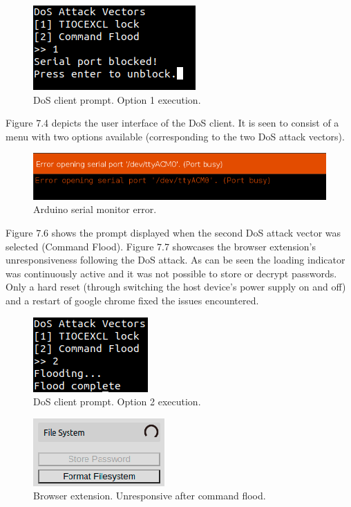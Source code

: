 \begin{figure}[H]
\centering
\includegraphics[width=0.35\columnwidth]{Figures/Fig_32.png}
\caption{DoS client prompt. Option 1 execution.}
\label{fig:gantt}
\end{figure}

Figure 7.4 depicts the user interface of the DoS client. It is seen to consist of a menu with two options available (corresponding to the two DoS attack vectors).
\begin{figure}[H]
\centering
\includegraphics[width=0.9\columnwidth]{Figures/Fig_31.png}
\caption{Arduino serial monitor error.}
\label{fig:gantt}
\end{figure}

Figure 7.6 shows the prompt displayed when the second DoS attack vector was selected (Command Flood). Figure 7.7 showcases the browser extension's unresponsiveness following the DoS attack. As can be seen the loading indicator was continuously active and it was not possible to store or decrypt passwords. Only a hard reset (through switching the host device's power supply on and off) and a restart of google chrome fixed the issues encountered.  
\begin{figure}[H]
\centering
\includegraphics[width=0.25\columnwidth]{Figures/Fig_33.png}
\caption{DoS client prompt. Option 2 execution.}
\label{fig:gantt}
\end{figure}


\begin{figure}[H]
\centering
\includegraphics[width=0.3\columnwidth]{Figures/Fig_35.png}
\caption{Browser extension. Unresponsive after command flood.}
\label{fig:gantt}
\end{figure}


